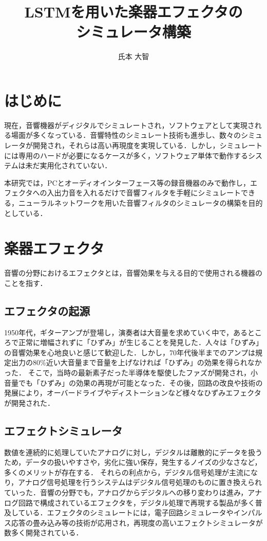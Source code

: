\documentclass{jreport}		%
\title{LSTMを用いた楽器エフェクタの\\シミュレータ構築}	%
\author{氏本 大智}		%
\begin{document}
%
\maketitle		%
\tableofcontents	%

\chapter{はじめに}
現在，音響機器がディジタルでシミュレートされ，ソフトウェアとして実現される場面が多くなっている．音響特性のシミュレート技術も進歩し、数々のシミュレータが開発され，それらは高い再現度を実現している．しかし，シミュレートには専用のハードが必要になるケースが多く，ソフトウェア単体で動作するシステムは未だ実用化されていない．

本研究では，PCとオーディオインターフェース等の録音機器のみで動作し，エフェクタへの入出力音を入れるだけで音響フィルタを手軽にシミュレートできる，ニューラルネットワークを用いた音響フィルタのシミュレータの構築を目的としている．

\chapter{楽器エフェクタ}
音響の分野におけるエフェクタとは，音響効果を与える目的で使用される機器のことを指す．

\section{エフェクタの起源}
1950年代，ギターアンプが登場し，演奏者は大音量を求めていく中で，あるところで正常に増幅されずに「ひずみ」が生じることを発見した．人々は「ひずみ」の音響効果を心地良いと感じて歓迎した．しかし，70年代後半までのアンプは規定出力の80\%近い大音量まで音量を上げなければ「ひずみ」の効果を得られなかった．
そこで，当時の最新素子だった半導体を駆使したファズが開発され，小音量でも「ひずみ」の効果の再現が可能となった．その後，回路の改良や技術の発展により，オーバードライブやディストーションなど様々なひずみエフェクタが開発された．\cite{sinco}

\section{エフェクトシミュレータ}
数値を連続的に処理していたアナログに対し，デジタルは離散的にデータを扱うため，データの扱いやすさや，劣化に強い保存，発生するノイズの少なさなど，多くのメリットが存在する．
それらの利点から，デジタル信号処理が主流になり，アナログ信号処理を行うシステムはデジタル信号処理のものに置き換えられていった．音響の分野でも，アナログからデジタルへの移り変わりは進み，アナログ回路で構成されているエフェクタを，デジタル処理で再現する製品が多く普及している．エフェクタのシミュレートには，電子回路シミュレータやインパルス応答の畳み込み等の技術が応用され，再現度の高いエフェクトシミュレータが数多く開発されている．
\end{document}
